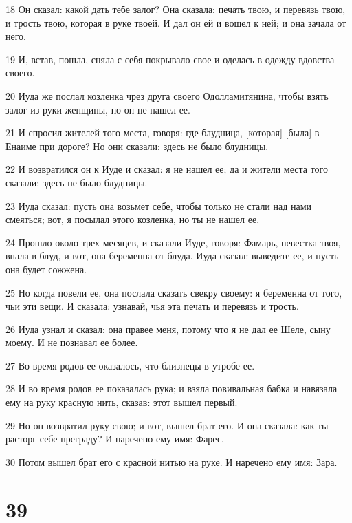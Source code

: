 \par 18 Он сказал: какой дать тебе залог? Она сказала: печать твою, и перевязь твою, и трость твою, которая в руке твоей. И дал он ей и вошел к ней; и она зачала от него.
\par 19 И, встав, пошла, сняла с себя покрывало свое и оделась в одежду вдовства своего.
\par 20 Иуда же послал козленка чрез друга своего Одолламитянина, чтобы взять залог из руки женщины, но он не нашел ее.
\par 21 И спросил жителей того места, говоря: где блудница, [которая] [была] в Енаиме при дороге? Но они сказали: здесь не было блудницы.
\par 22 И возвратился он к Иуде и сказал: я не нашел ее; да и жители места того сказали: здесь не было блудницы.
\par 23 Иуда сказал: пусть она возьмет себе, чтобы только не стали над нами смеяться; вот, я посылал этого козленка, но ты не нашел ее.
\par 24 Прошло около трех месяцев, и сказали Иуде, говоря: Фамарь, невестка твоя, впала в блуд, и вот, она беременна от блуда. Иуда сказал: выведите ее, и пусть она будет сожжена.
\par 25 Но когда повели ее, она послала сказать свекру своему: я беременна от того, чьи эти вещи. И сказала: узнавай, чья эта печать и перевязь и трость.
\par 26 Иуда узнал и сказал: она правее меня, потому что я не дал ее Шеле, сыну моему. И не познавал ее более.
\par 27 Во время родов ее оказалось, что близнецы в утробе ее.
\par 28 И во время родов ее показалась рука; и взяла повивальная бабка и навязала ему на руку красную нить, сказав: этот вышел первый.
\par 29 Но он возвратил руку свою; и вот, вышел брат его. И она сказала: как ты расторг себе преграду? И наречено ему имя: Фарес.
\par 30 Потом вышел брат его с красной нитью на руке. И наречено ему имя: Зара.

\chapter{39}

